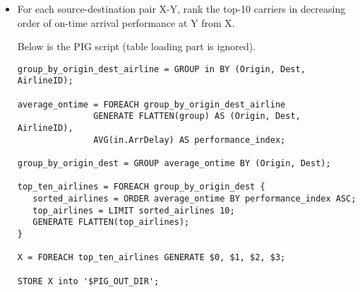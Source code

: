 \documentclass[fontsize=11pt,paper=a4]{scrartcl}
\begin{document}
\begin{itemize}
\item For each source-destination pair X-Y, rank the top-10 carriers in decreasing order of on-time arrival performance at Y from X.

Below is the PIG script (table loading part is ignored). 
\small\begin{verbatim}
group_by_origin_dest_airline = GROUP in BY (Origin, Dest, AirlineID);

average_ontime = FOREACH group_by_origin_dest_airline
               GENERATE FLATTEN(group) AS (Origin, Dest, AirlineID),
               AVG(in.ArrDelay) AS performance_index;

group_by_origin_dest = GROUP average_ontime BY (Origin, Dest);

top_ten_airlines = FOREACH group_by_origin_dest {
   sorted_airlines = ORDER average_ontime BY performance_index ASC;
   top_airlines = LIMIT sorted_airlines 10;
   GENERATE FLATTEN(top_airlines);
}

X = FOREACH top_ten_airlines GENERATE $0, $1, $2, $3;

STORE X into '$PIG_OUT_DIR';
\end{verbatim}
\normalsize


\end{itemize}
\end{document}

